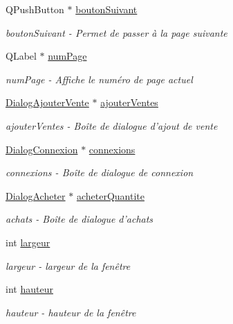 \begin{DoxyCompactItemize}
Q\-Push\-Button $\ast$ \hyperlink{class_ma_fenetre_a54110f455a71febc15224b68470dd80e}{bouton\-Suivant}
\begin{DoxyCompactList}\small\item\em bouton\-Suivant -\/ Permet de passer à la page suivante \end{DoxyCompactList}\item 
Q\-Label $\ast$ \hyperlink{class_ma_fenetre_a941eff753d1e20d0ef212aa875570330}{num\-Page}
\begin{DoxyCompactList}\small\item\em num\-Page -\/ Affiche le numéro de page actuel \end{DoxyCompactList}\item 
\hyperlink{class_dialog_ajouter_vente}{Dialog\-Ajouter\-Vente} $\ast$ \hyperlink{class_ma_fenetre_a2332279c45b76ac1c9daf739c0bb3958}{ajouter\-Ventes}
\begin{DoxyCompactList}\small\item\em ajouter\-Ventes -\/ Boîte de dialogue d'ajout de vente \end{DoxyCompactList}\item 
\hyperlink{class_dialog_connexion}{Dialog\-Connexion} $\ast$ \hyperlink{class_ma_fenetre_a3c115601ad85a01422813dcdf48eb44d}{connexions}
\begin{DoxyCompactList}\small\item\em connexions -\/ Boîte de dialogue de connexion \end{DoxyCompactList}\item 
\hyperlink{class_dialog_acheter}{Dialog\-Acheter} $\ast$ \hyperlink{class_ma_fenetre_a8682e6343da2d0c2bfe1fab3ff0e7baa}{acheter\-Quantite}
\begin{DoxyCompactList}\small\item\em achats -\/ Boîte de dialogue d'achats \end{DoxyCompactList}\item 
int \hyperlink{class_ma_fenetre_abe37db89fd8895cc34ccc0f5cda67aaf}{largeur}
\begin{DoxyCompactList}\small\item\em largeur -\/ largeur de la fenêtre \end{DoxyCompactList}\item 
int \hyperlink{class_ma_fenetre_ae1a802d46705239d08d3bf06cd99b802}{hauteur}
\begin{DoxyCompactList}\small\item\em hauteur -\/ hauteur de la fenêtre \end{DoxyCompactList}\item 

\end{DoxyCompactItemize}
